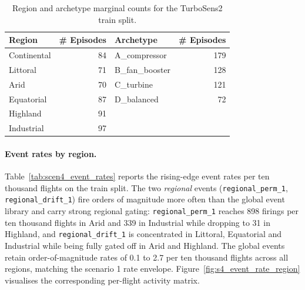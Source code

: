 \begin{table}[h]
\centering
\caption{Region and archetype marginal counts for the TurboSens2 train split.}
\label{tab:scen4_region_archetype}
\small
\begin{tabular}{lrlr}
\toprule
Region & \# Episodes & Archetype & \# Episodes \\
\midrule
Continental & 84 & A\_compressor   & 179 \\
Littoral    & 71 & B\_fan\_booster & 128 \\
Arid        & 70 & C\_turbine      & 121 \\
Equatorial  & 87 & D\_balanced     &  72 \\
Highland    & 91 & & \\
Industrial  & 97 & & \\
\bottomrule
\end{tabular}
\end{table}

\paragraph{Event rates by region.}
Table~\ref{tab:scen4_event_rates} reports the rising-edge event rates
per ten thousand flights on the train split. The two
\emph{regional} events (\texttt{regional\_perm\_1},
\texttt{regional\_drift\_1}) fire orders of magnitude more often than
the global event library and carry strong regional gating:
\texttt{regional\_perm\_1} reaches 898 firings per ten thousand
flights in Arid and 339 in Industrial while dropping to 31 in Highland,
and \texttt{regional\_drift\_1} is concentrated in Littoral, Equatorial
and Industrial while being fully gated off in Arid and Highland.
The global events retain order-of-magnitude rates of 0.1 to 2.7 per
ten thousand flights across all regions, matching the scenario 1 rate
envelope. Figure~\ref{fig:s4_event_rate_region} visualises the
corresponding per-flight activity matrix.

